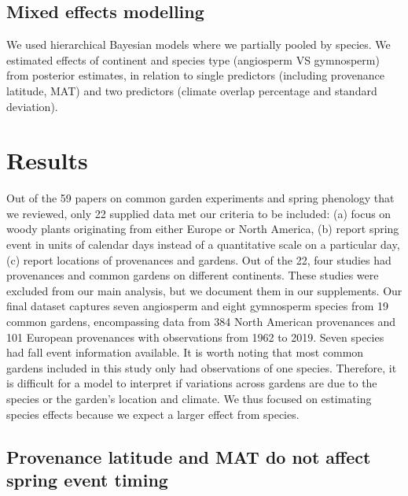 \documentclass{article}
\begin{document}
\subsection{Mixed effects modelling}

We used hierarchical Bayesian models where we partially pooled by species. We estimated effects of continent and species type (angiosperm VS gymnosperm) from posterior estimates, in relation to single predictors (including provenance latitude, MAT) and two predictors (climate overlap percentage and standard deviation). 


\section{Results}

Out of the 59 papers on common garden experiments and spring phenology that we reviewed, only 22 supplied data met our criteria to be included: (a) focus on woody plants originating from either Europe or North America, (b) report spring event in units of calendar days instead of a quantitative scale on a particular day, (c) report locations of provenances and gardens. Out of the 22, four studies had provenances and common gardens on different continents. These studies were excluded from our main analysis, but we document them in our supplements.
Our final dataset captures seven angiosperm and eight gymnosperm species from 19 common gardens, encompassing data from 384 North American provenances and 101 European provenances with observations from 1962 to 2019. Seven species had fall event information available. 
It is worth noting that most common gardens included in this study only had observations of one species. Therefore, it is difficult for a model to interpret if variations across gardens are due to the species or the garden’s location and climate.  We thus focused on estimating species effects because we expect a larger effect from species. 


\subsection{Provenance latitude and MAT do not affect spring event timing}
\end{document}
